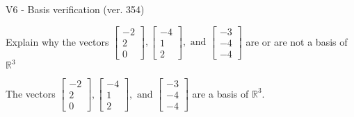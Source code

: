 \begin{exercise}
  \begin{exerciseTitle}V6 - Basis verification (ver. 354)\end{exerciseTitle}
  \begin{exerciseStatement}
    Explain why the vectors \(\left[\begin{array}{r}
-2 \\
2 \\
0
\end{array}\right] , \left[\begin{array}{r}
-4 \\
1 \\
2
\end{array}\right] , \text{ and } \left[\begin{array}{r}
-3 \\
-4 \\
-4
\end{array}\right]\) are or are not a basis of \(\mathbb{R}^3\)	


  \end{exerciseStatement}
  \begin{exerciseAnswer}
   The vectors \(\left[\begin{array}{r}
-2 \\
2 \\
0
\end{array}\right] , \left[\begin{array}{r}
-4 \\
1 \\
2
\end{array}\right] , \text{ and } \left[\begin{array}{r}
-3 \\
-4 \\
-4
\end{array}\right]\) 
  	 are  a basis of \(\mathbb{R}^3\).
  


  \end{exerciseAnswer}
\end{exercise}